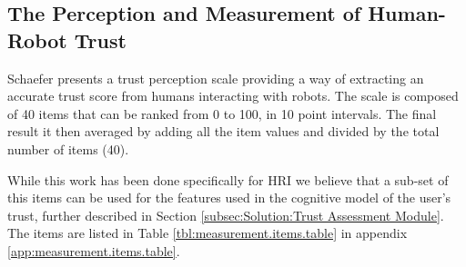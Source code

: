 \subsection{The Perception and Measurement of Human-Robot Trust}
\label{subsec:Related work:The Perception and Measurement of Human-Robot Trust}

Schaefer\cite{Schaefer2009} presents a trust perception scale providing a way of extracting an accurate trust score from humans interacting with robots. The scale is composed of 40 items that can be ranked from 0 to 100, in 10 point intervals. The final result it then averaged by adding all the item values and divided by the total number of items (40). 

While this work has been done specifically for \ac{HRI} we believe that a sub-set of this items can be used for the features used in the cognitive model of the user's trust, further described in Section \ref{subsec:Solution:Trust Assessment Module}. The items are listed in Table \ref{tbl:measurement.items.table} in appendix \ref{app:measurement.items.table}.
